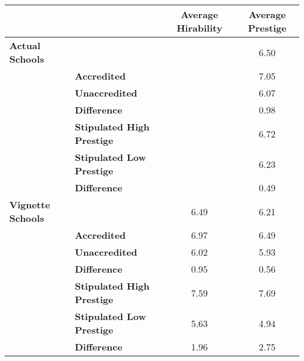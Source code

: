 {
\def\sym#1{\ifmmode^{#1}\else\(^{#1}\)\fi}
\begin{tabular}{llcc}
    \toprule
                              &                                   & \textbf{Average Hirability} & \textbf{Average Prestige} \\
    \midrule
    \textbf{Actual Schools}   &                                   &                             & 6.50                      \\
                              & \textbf{Accredited}               &                             & 7.05                      \\
                              & \textbf{Unaccredited}             &                             & 6.07                      \\
                              & \textbf{Difference}               &                             & 0.98                      \\
    \cmidrule{2-4}
                              & \textbf{Stipulated High Prestige} &                             & 6.72                      \\
                              & \textbf{Stipulated Low Prestige}  &                             & 6.23                      \\
                              & \textbf{Difference}               &                             & 0.49                      \\
    \cmidrule{2-4}
    \textbf{Vignette Schools} &                                   & 6.49                        & 6.21                      \\
                              & \textbf{Accredited}               & 6.97                        & 6.49                      \\
                              & \textbf{Unaccredited}             & 6.02                        & 5.93                      \\
                              & \textbf{Difference}               & 0.95                        & 0.56                      \\
    \cmidrule{2-4}
                              & \textbf{Stipulated High Prestige} & 7.59                        & 7.69                      \\
                              & \textbf{Stipulated Low Prestige}  & 5.63                        & 4.94                      \\
                              & \textbf{Difference}               & 1.96                        & 2.75                      \\

\end{tabular}}
